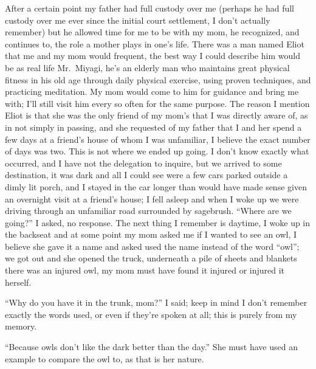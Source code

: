 \documentclass[12pt]{article}
\begin{document}
After a certain point my father had full custody over me (perhaps he had full
custody over me ever since the initial court settlement, I don't actually
remember) but he allowed time for me to be with my mom, he recognized, and
continues to, the role a mother plays in one's life. There was a man named Eliot
that me and my mom would frequent, the best way I could describe him would be as
real life Mr.\ Miyagi, he's an elderly man who maintains great physical fitness
in his old age through daily physical exercise, using proven techniques, and
practicing meditation. My mom would come to him for guidance and bring me with;
I'll still visit him every so often for the same purpose. The reason I mention
Eliot is that she was the only friend of my mom's that I was directly aware of,
as in not simply in passing, and she requested of my father that I and her spend
a few days at a friend's house of whom I was unfamiliar, I believe the exact
number of days was two. This is not where we ended up going. I don't know
exactly what occurred, and I have not the delegation to inquire, but we arrived
to some destination, it was dark and all I could see were a few cars parked
outside a dimly lit porch, and I stayed in the car longer than would have made
sense given an overnight visit at a friend's house; I fell asleep and when I
woke up we were driving through an unfamiliar road surrounded by sagebrush.
``Where are we going?'' I asked, no response. The next thing I remember is
daytime, I woke up in the backseat and at some point my mom asked me if I wanted
to see an owl, I believe she gave it a name and asked used the name instead of
the word ``owl''; we got out and she opened the truck, underneath a pile of
sheets and blankets there was an injured owl, my mom must have found it injured
or injured it herself.

``Why do you have it in the trunk, mom?'' I said; keep in mind I don't remember
exactly the words used, or even if they're spoken at all; this is purely from my
memory.

``Because owls don't like the dark better than the day.'' She must have used an
example to compare the owl to, as that is her nature.
\end{document}
